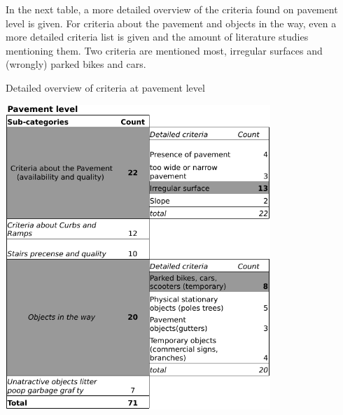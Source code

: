 In the next table, a more detailed overview of the criteria found on pavement level is given. For criteria about the pavement and objects in the way, even a more detailed criteria list is given and the amount of literature studies mentioning them. Two criteria are mentioned most, irregular surfaces and (wrongly) parked bikes and cars. 
\clearpage

\begin{table}[tp]
\centering
\caption{Detailed overview of criteria at pavement level \label{literaturepavement}}
\includegraphics[width=0.75\textwidth]{img/R_Final_overview_literature_pavement.pdf}
\end{table}







